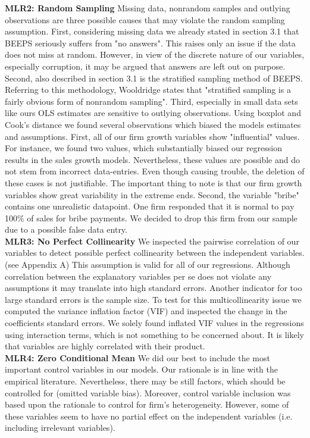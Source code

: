 \textbf{MLR2: Random Sampling
}
Missing data, nonrandom samples and outlying observations are three possible causes that may violate the random sampling assumption. First, considering missing data we already stated in section 3.1 that BEEPS seriously suffers from "no answers". This raises only an issue if the data does not miss at random. However, in view of the discrete nature of our variables, especially corruption, it may be argued that answers are left out on purpose. Second, also described in section 3.1 is the stratified sampling method of BEEPS. Referring to this methodology, Wooldridge states that "stratified sampling is a fairly obvious form of nonrandom sampling". Third, especially in small data sets like ours OLS estimates are sensitive to outlying observations. \citep[pp. 352-355]{wooldridge} Using boxplot and Cook's distance we found several observations which biased the models estimates and assumptions. First, all of our firm growth variables show "influential" values. For instance, we found two values, which substantially biased our regression results in the sales growth models. Nevertheless, these values are possible and do not stem from incorrect data-entries. Even though causing trouble, the deletion of these cases is not justifiable. The important thing to note is that our firm growth variables show great variability in the extreme ends. Second, the variable "bribe" contains one unrealistic datapoint. One firm responded that it is normal to pay 100\% of sales for bribe payments. We decided to drop this firm from our sample due to a possible false data entry. \\


\textbf{MLR3: No Perfect Collinearity
}
We inspected the pairwise correlation of our variables to detect possible perfect collinearity between the independent variables. (see Appendix A) This assumption is valid for all of our regressions. Although correlation between the explanatory variables per se does not violate any assumptions it may translate into high standard errors. Another indicator for too large standard errors is the sample size. \citep[p. 352]{wooldridge} To test for this multicollinearity issue we computed the variance inflation factor (VIF) and inspected the change in the coefficients standard errors. We solely found inflated VIF values in the regressions using interaction terms, which is not something to be concerned about. It is likely that variables are highly correlated with their product. \\


\textbf{MLR4: Zero Conditional Mean
}
We did our best to include the most important control variables in our models. Our rationale is in line with the empirical literature. Nevertheless, there may be still factors, which should be controlled for (omitted variable bias). Moreover, control variable inclusion was based upon the rationale to control for firm's heterogeneity. However, some of these variables seem to have no partial effect on the independent variables (i.e. including irrelevant variables). \citep[pp. 115--117]{wooldridge}

